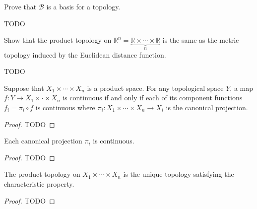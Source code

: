 \begin{exercise}
	\begin{problem}
	Prove that $ \mathcal{B} $ is a basis for a topology.
	\end{problem}
	\begin{solution}
		TODO
	\end{solution}
\end{exercise}

\begin{exercise}
	\begin{problem}
	Show that the product topology on $ \mathbb{R}^{n} = \underbrace{\mathbb{R}\times \cdots \times \mathbb{R}}_{n} $ is the same as the metric topology induced by the Euclidean distance function.
	\end{problem}
	\begin{solution}
		TODO
	\end{solution}
\end{exercise}

\begin{theorem}
	Suppose that $ X_{1}\times \cdots \times X_{n} $ is a product space. For any topological space $ Y $, a map $ f:Y \to X_{1}\times \cdot \times X_{n} $ is continuous if and only if each of its component functions $ f_{i} = \pi_{i}\circ f $ is continuous where $ \pi_{i}:X_{1}\times \cdots \times X_{n}\to X_{i} $ is the canonical projection.
	\begin{proof}
		TODO
	\end{proof}
\end{theorem}

\begin{corollary}
	Each canonical projection $ \pi_{i} $ is continuous.
	\begin{proof}
		TODO
	\end{proof}
\end{corollary}

\begin{theorem}
	The product topology on $ X_{1}\times \cdots \times X_{n} $ is the unique topology satisfying the characteristic property.
	\begin{proof}
		TODO
	\end{proof}
\end{theorem}

